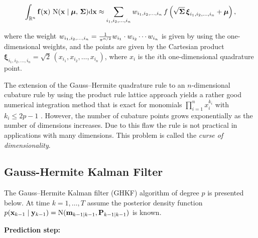 \begin{equation}
    \int_{\mathbb{R}^n} \mathbf{f}(\mathbf{x})\,\operatorname{N}(\mathbf{x} \mid \boldsymbol{\mu},\, \mathbf{\Sigma})\mathrm{d}\mathbf{x} 
    \approx \sum_{i_1, i_2, \ldots, i_n} w_{i_1, i_2, \ldots, i_n} \, f\left(\sqrt{\mathbf{\Sigma}}\, \boldsymbol{\xi}_{i_1, i_2, \ldots, i_n} +\boldsymbol{\mu} \right),
\end{equation}

\noindent%
where the weight $w_{i_1, i_2, \ldots, i_n} = {1 \over \pi^{n/2}} w_{i_1} \cdot w_{i_2} \cdots w_{i_n}$ is given by using the one-dimensional weights, and the points are given by the Cartesian product $\boldsymbol{\xi}_{i_1, i_2, \ldots, i_n} = \sqrt{2} \, (x_{i_1}, x_{i_2}, \ldots, x_{i_n})$, where $x_i$ is the $i$th one-dimensional quadrature point. 

The extension of the Gauss--Hermite quadrature rule to an $n$-dimensional cubature rule by using the product rule lattice approach yields a rather good numerical integration method that is exact for monomials $\prod_{i=1}^n x_i^{k_i} $ with $k_i \leq 2p - 1$ \citep{Wu+Hu+Wu+Hu:2006}. However, the number of cubature points grows exponentially as the number of dimensions increases. Due to this flaw the rule is not practical in applications with many dimensions. This problem is called the \emph{curse of dimensionality}.












%
\subsection{Gauss-Hermite Kalman Filter}
%

The Gauss--Hermite Kalman filter (GHKF) algorithm of degree $p$ is presented below. At time $k = 1,\ldots,T$ assume the posterior density function $ p(\mathbf{x}_{k-1} \mid \mathbf{y}_{k-1}) = \operatorname{N}(\mathbf{m}_{k-1 \mid k-1},\mathbf{P}_{k-1 \mid k-1})$ is known.


\textbf{Prediction step:}

